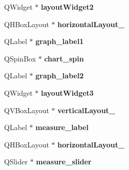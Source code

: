 \begin{DoxyCompactItemize}
\item 
\hypertarget{class_ui___dialog_af959e1f33e58899284a9c05925bb4dc8}{
QWidget $\ast$ {\bfseries layoutWidget2}}
\label{class_ui___dialog_af959e1f33e58899284a9c05925bb4dc8}

\item 
\hypertarget{class_ui___dialog_a588f07833df3f10d10139816bf5adb3f}{
QHBoxLayout $\ast$ {\bfseries horizontalLayout\_}}
\label{class_ui___dialog_a588f07833df3f10d10139816bf5adb3f}

\item 
\hypertarget{class_ui___dialog_a27c5acddae8a899b23ab77c154063a9d}{
QLabel $\ast$ {\bfseries graph\_\-label1}}
\label{class_ui___dialog_a27c5acddae8a899b23ab77c154063a9d}

\item 
\hypertarget{class_ui___dialog_a92bfcd2ffd3b08612fb8a7d4e444e4e3}{
QSpinBox $\ast$ {\bfseries chart\_\-spin}}
\label{class_ui___dialog_a92bfcd2ffd3b08612fb8a7d4e444e4e3}

\item 
\hypertarget{class_ui___dialog_a3dbee3c6468dda3601ae7f6daa2c09f0}{
QLabel $\ast$ {\bfseries graph\_\-label2}}
\label{class_ui___dialog_a3dbee3c6468dda3601ae7f6daa2c09f0}

\item 
\hypertarget{class_ui___dialog_a09b45474b3c768071a15b7876e520623}{
QWidget $\ast$ {\bfseries layoutWidget3}}
\label{class_ui___dialog_a09b45474b3c768071a15b7876e520623}

\item 
\hypertarget{class_ui___dialog_afa011080e484d395a5158edf7ae19c2a}{
QVBoxLayout $\ast$ {\bfseries verticalLayout\_}}
\label{class_ui___dialog_afa011080e484d395a5158edf7ae19c2a}

\item 
\hypertarget{class_ui___dialog_a4ac89aafac432389fb3a29b85a9d5e77}{
QLabel $\ast$ {\bfseries measure\_\-label}}
\label{class_ui___dialog_a4ac89aafac432389fb3a29b85a9d5e77}

\item 
\hypertarget{class_ui___dialog_aba5f77de36ab458a482af58b2092275e}{
QHBoxLayout $\ast$ {\bfseries horizontalLayout\_}}
\label{class_ui___dialog_aba5f77de36ab458a482af58b2092275e}

\item 
\hypertarget{class_ui___dialog_af6fefa91def76062d3cb8b1a7439abff}{
QSlider $\ast$ {\bfseries measure\_\-slider}}
\label{class_ui___dialog_af6fefa91def76062d3cb8b1a7439abff}


\end{DoxyCompactItemize}
